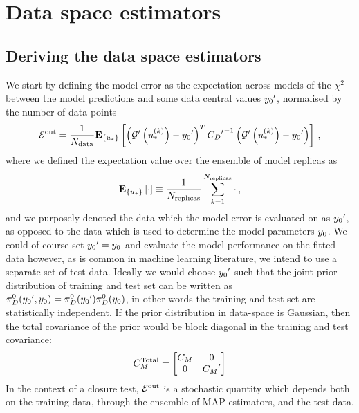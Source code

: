 \section{Data space estimators} \label{sec:ClosureEstimators}

\subsection{Deriving the data space estimators}

We start by defining the model error as the expectation across models of the
$\chi^2$ between the model predictions and some data central values
${{y_0}^{\prime}}$, normalised by the number of data points
\begin{equation}
    \label{eq:chi2kerep}
    \mathcal{E}^{\rm out} = \frac{1}{N_{\rm data}} \mathbf{E}_{\{ u_* \}} \left[ 
        \left( {{\mathcal{G}}^{\prime}}\left(u_*^{(k)}\right) - {{y_0}^{\prime}} \right)^T
        {{C_{D}}^{\prime}}^{-1}
        \left( {{\mathcal{G}}^{\prime}}\left(u_*^{(k)}\right) - {{y_0}^{\prime}} \right)
     \right]\, ,
\end{equation}
where we defined the expectation value over the ensemble of model replicas as
\begin{equation}
    \mathbf{E}_{\{ u_* \}} \left[ \cdot \right] \equiv \frac{1}{N_{\rm replicas}} \sum_{k=1}^{N_{\rm replicas}} \cdot \, ,
\end{equation}
and we purposely denoted the data which the model error is evaluated on as
${{y_0}^{\prime}}$, as opposed to the data which is used to determine the model
parameters $y_0$. We could of course set
${{y_0}^{\prime}} = y_0$ and
evaluate the model performance on the fitted data however, as is common in
machine learning literature, we intend to use a separate set of test data.
Ideally we would choose ${{y_0}^{\prime}}$ such that the joint prior
distribution of training and test set can be written as
$\pi_{D}^0({{y_0}^{\prime}}, y_0) =
\pi_{D}^0({{y_0}^{\prime}})\pi_{D}^0(y_0)$, in other words the
training and test set are statistically independent. If the prior distribution
in data-space is Gaussian, then the total covariance of the prior would be
block diagonal in the training and test covariance:
\begin{equation}
    C_M^{\rm Total} =
    \begin{bmatrix}
        C_M  & 0  \\ 
        0  & {{C_M}^{\prime}}  \\ 
    \end{bmatrix}
\end{equation}
In the
context of a closure test, $\mathcal{E}^{\rm out}$ is a stochastic quantity which depends both
on the training data, through the ensemble of MAP estimators, and the test data.

